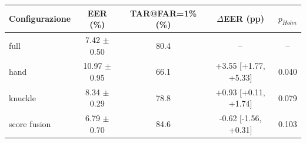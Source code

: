 \begin{tabular}{lcccc}
\toprule
Configurazione & EER (\%) & TAR@FAR=1\% (\%) & $\Delta$EER (pp) & $p_{Holm}$ \\
\midrule
full & 7.42 $\pm$ 0.50 & 80.4 & -- & -- \\
hand & 10.97 $\pm$ 0.95 & 66.1 & +3.55 [+1.77, +5.33] & 0.040 \\
knuckle & 8.34 $\pm$ 0.29 & 78.8 & +0.93 [+0.11, +1.74] & 0.079 \\
score fusion & 6.79 $\pm$ 0.70 & 84.6 & -0.62 [-1.56, +0.31] & 0.103 \\
\bottomrule
\end{tabular}